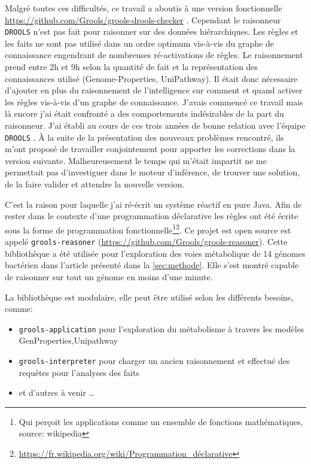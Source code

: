 \begin{refsegment}
Malgré toutes ces difficultés, ce travail a aboutis à une version fonctionnelle \url{https://github.com/Grools/grools-drools-checker} . Cependant le raisonneur \texttt{DROOLS} n'est pas fait pour raisonner sur des données hiérarchiques. Les règles et les faits ne sont pas utilisé dans un ordre optimum vis-à-vis du graphe de connaissance engendrant de nombreuses ré-activations de règles. Le raisonnement prend entre 2h et 9h selon la quantité de fait et la représentation des connaissances utilisé (Genome-Properties, UniPathway). Il était donc nécessaire d'ajouter en plus du raisonnement de l'intelligence sur comment et quand activer les règles vis-à-vis d'un graphe de connaissance. J'avais commencé ce travail mais là encore j'ai était confronté a des comportements indésirables de la part du raisonneur. J'ai établi au cours de ces trois années de bonne relation avec l'équipe \texttt{DROOLS} . À la suite de la présentation  des nouveaux problèmes rencontré, ils m'ont proposé de travailler conjointement pour apporter les corrections dans la version suivante. Malheureusement le temps qui m'était impartit ne me permettait pas d'investiguer dans le moteur d'inférence, de trouver une solution, de la faire valider et attendre la nouvelle version.

C'est la raison pour laquelle j'ai ré-écrit un système réactif en pure Java. Afin de rester dans le contexte d'une programmation  déclarative les règles ont été écrite sous la forme de programmation fonctionnelle\footnote{Qui perçoit les applications comme un ensemble de fonctions mathématiques, source: wikipedia}\footnote{\url{https://fr.wikipedia.org/wiki/Programmation_déclarative}}. Ce projet est open source est appelé \texttt{grools-reasoner} (\url{https://github.com/Grools/grools-reasoner}). Cette bibliothèque a été utilisée pour l'exploration des voies métabolique de 14 génomes bactérien dans l'article présenté dans la  \cref{sec:methode}. Elle s'est montré capable de raisonner sur tout un génome en moins d'une minute.

La bibliothèque est modulaire, elle peut être utilisé selon les différents besoins, comme:\nolisttopbreak
\begin{itemize}
	\item \texttt{grools-application} pour l'exploration du métabolisme à travers les modèles GenProperties,Unipathway 
	\item \texttt{grools-interpreter} pour charger un ancien raisonnement et effectué des requêtes pour l'analyses des faits
	\item et d'autres à venir \ldots
\end{itemize}

\subbibliography
\end{refsegment}